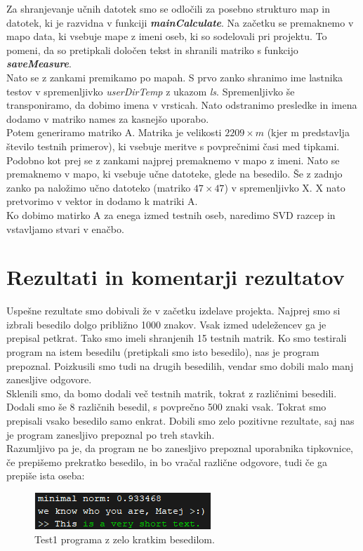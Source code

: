 \documentclass[12pt]{article}
\begin{document}
\pagebreak
Za shranjevanje učnih datotek smo se odločili za posebno strukturo map in datotek, ki je razvidna v funkciji 
\textbf{\textit{mainCalculate}}. Na začetku se premaknemo v mapo data, ki vsebuje mape z imeni oseb, 
ki so sodelovali pri projektu. To pomeni, da so pretipkali določen tekst in shranili matriko s funkcijo \textbf{\textit{saveMeasure}}.\\
\newline
Nato se z zankami premikamo po mapah. S prvo zanko shranimo ime lastnika testov v spremenljivko \textit{userDirTemp} 
z ukazom \textit{ls}. Spremenljivko še transponiramo, da dobimo imena v vrsticah. Nato odstranimo presledke in imena dodamo v matriko 
names za kasnejšo uporabo.\\
\newline
Potem generiramo matriko A. Matrika je velikosti $2209 \times m$ (kjer m predstavlja število testnih primerov), ki vsebuje meritve s 
povprečnimi časi med tipkami.\\
\newline
Podobno kot prej se z zankami najprej premaknemo v mapo z imeni. Nato se premaknemo v mapo, ki vsebuje učne datoteke, 
glede na besedilo. Še z zadnjo zanko pa naložimo učno datoteko (matriko $47\times 47$) v spremenljivko X. X nato pretvorimo v vektor 
in dodamo k matriki A. \\
\newline
Ko dobimo matirko A za enega izmed testnih oseb, naredimo SVD razcep in vstavljamo stvari v enačbo.

\section{Rezultati in komentarji rezultatov}
Uspešne rezultate smo dobivali že v začetku izdelave projekta. Najprej smo si izbrali besedilo dolgo 
približno 1000 znakov. Vsak izmed udeležencev ga je prepisal petkrat. Tako smo imeli shranjenih 15 testnih 
matrik. Ko smo testirali program na istem besedilu (pretipkali smo isto besedilo), nas je program prepoznal. 
Poizkusili smo tudi na drugih besedilih, vendar smo dobili malo manj zanesljive odgovore. \\
\newline
Sklenili smo, da bomo dodali več testnih matrik, tokrat z različnimi besedili. Dodali smo še 8 različnih besedil, 
s povprečno 500 znaki vsak. Tokrat smo prepisali vsako besedilo samo enkrat. Dobili smo zelo pozitivne rezultate, 
saj nas je program zanesljivo prepoznal po treh stavkih. \\
\newline
Razumljivo pa je, da program ne bo zanesljivo prepoznal uporabnika tipkovnice, če prepišemo prekratko besedilo, in bo 
vračal različne odgovore, tudi če ga prepiše ista oseba:
\begin{figure}[h]
             \centering
             \includegraphics{correct_guy}
             \caption{Test1 programa z zelo kratkim besedilom.}
\end{figure}
\end{document}
